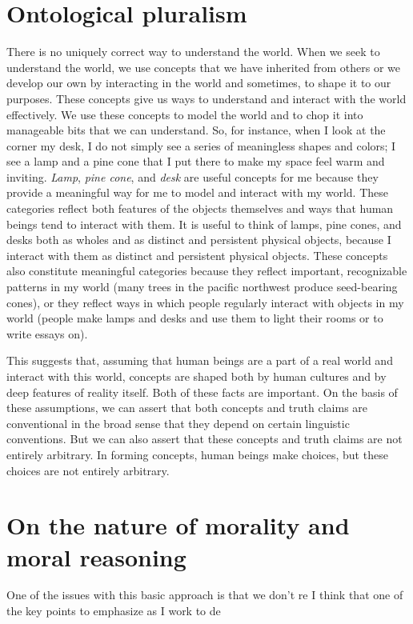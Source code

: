\section{Ontological pluralism}
\label{sec:ont_plural}
There is no uniquely correct way to understand the world.
When we seek to understand the world, we use concepts that we have inherited
from others or we develop our own by interacting in the world and sometimes, to
shape it to our purposes.
These concepts give us ways to understand and interact with the world
effectively.
We use these concepts to model the world and to chop it into manageable bits
that we can understand.
So, for instance, when I look at the corner my desk, I do not simply see a
series of meaningless shapes and colors; I see a lamp and a pine cone that I
put there to make my space feel warm and inviting.
\emph{Lamp}, \emph{pine cone}, and \emph{desk} are useful concepts for me because they
provide a meaningful way for me to model and interact with my world.
These categories reflect both features of the objects themselves and ways that
human beings tend to interact with them.
It is useful to think of lamps, pine cones, and desks both as wholes and as
distinct and persistent physical objects, because I interact with them as
distinct and persistent physical objects.
These concepts also constitute meaningful categories because they reflect
important, recognizable patterns in my world (many trees in the pacific
northwest produce seed-bearing cones), or they reflect ways in which people
regularly interact with objects in my world (people make lamps and desks and
use them to light their rooms or to write essays on).

This suggests that, assuming that human beings are a part of a real world and
interact with this world, concepts are shaped both by human cultures and by deep
features of reality itself.
Both of these facts are important.
On the basis of these assumptions, we can assert that both concepts and truth
claims are conventional in the broad sense that they depend on certain linguistic
conventions.
But we can also assert that these concepts and truth claims are not entirely
arbitrary.
In forming concepts, human beings make choices, but these choices are not
entirely arbitrary.
\section{On the nature of morality and moral reasoning}
\label{sec:nat_mor}
One of the issues with this basic approach is that we don't re
I think that one of the key points to emphasize as I work to de
